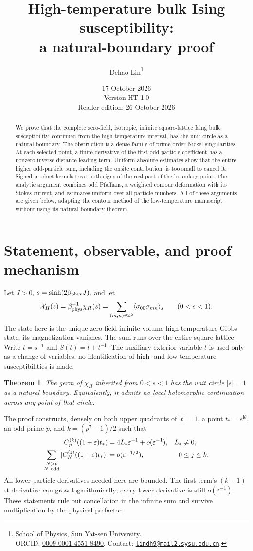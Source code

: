 \documentclass[11pt]{article}
\title{High-temperature bulk Ising susceptibility:\\a natural-boundary proof}
\author{Dehao Lin\thanks{\raggedright School of Physics, Sun Yat-sen University.\\ORCID: \href{https://orcid.org/0009-0001-4551-8490}{0009-0001-4551-8490}. Contact: \href{mailto:lindh9@mail2.sysu.edu.cn}{\texttt{lindh9@mail2.sysu.edu.cn}}.}}
\date{17 October 2026\\Version HT-1.0\\Reader edition: 26 October 2026}
\numberwithin{equation}{section}
\newtheorem{theorem}{Theorem}[section]
\theoremstyle{definition}
\newcommand{\ii}{\mathrm i}
\newcommand{\Z}{\mathbb Z}
\newcommand{\eps}{\varepsilon}
\begin{document}
\maketitle
\begin{abstract}
We prove that the complete zero-field, isotropic, infinite square-lattice
Ising bulk susceptibility, continued from the high-temperature interval,
has the unit circle as a natural boundary. The obstruction is a dense
family of prime-order Nickel singularities. At each selected point, a
finite derivative of the first odd-particle coefficient has a nonzero
inverse-distance leading term. Uniform absolute estimates show that the
entire higher odd-particle sum, including the onsite contribution, is too
small to cancel it. Signed product kernels treat both signs of the real
part of the boundary point. The analytic argument combines odd Pfaffians,
a weighted contour deformation with its Stokes current, and estimates
uniform over all particle numbers. All of these arguments are given
below, adapting the contour method of the low-temperature manuscript
without using its natural-boundary theorem.
\end{abstract}

\section{Statement, observable, and proof mechanism}\label{sec:scope}
Let $J>0$, $s=\sinh(2\beta_{\rm phys}J)$, and let
\[
 \mathcal X_H(s)=\beta_{\rm phys}^{-1}\chi_H(s)
 =\sum_{(m,n)\in\Z^2}\langle\sigma_{00}\sigma_{mn}\rangle_s
 \qquad(0<s<1).
\]
The state here is the unique zero-field infinite-volume high-temperature
Gibbs state; its magnetization vanishes. The sum runs over the entire
square lattice. Write $t=s^{-1}$ and $S(t)=t+t^{-1}$. The auxiliary
exterior variable $t$ is used only as a change of variables: no
identification of high- and low-temperature susceptibilities is made.

\begin{theorem}\label{thm:main}
The germ of $\chi_H$ inherited from $0<s<1$ has the unit circle
$|s|=1$ as a natural boundary. Equivalently, it admits no local
holomorphic continuation across any point of that circle.
\end{theorem}

The proof constructs, densely on both upper quadrants of $|t|=1$,
a point $t_*=e^{\ii\theta}$, an odd prime $p$, and
$k=(p^2-1)/2$ such that
\begin{align}
 C_p^{(k)}((1+\eps)t_*)&=4L_*\eps^{-1}+o(\eps^{-1}),
       &L_*&\ne0,\label{eq:roadmapfirst}\\
 \sum_{\substack{N>p\\N\ {\rm odd}}}
 |C_N^{(j)}((1+\eps)t_*)|&=o(\eps^{-1/2}),
       &0&\le j\le k.\label{eq:roadmaptail}
\end{align}
All lower-particle derivatives needed here are bounded. The first term's
$(k-1)$st derivative can grow logarithmically; every lower derivative
is still $o(\eps^{-1})$. These statements rule out cancellation in the
infinite sum and survive multiplication by the physical prefactor.
\end{document}
